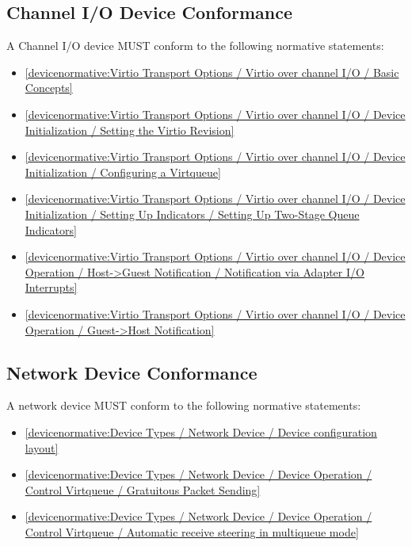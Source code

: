 \subsection{Channel I/O Device Conformance}\label{sec:Conformance / Device Conformance / Channel I/O Device Conformance}

A Channel I/O device MUST conform to the following normative statements:

\begin{itemize}
\item \ref{devicenormative:Virtio Transport Options / Virtio over channel I/O / Basic Concepts}
\item \ref{devicenormative:Virtio Transport Options / Virtio over channel I/O / Device Initialization / Setting the Virtio Revision}
\item \ref{devicenormative:Virtio Transport Options / Virtio over channel I/O / Device Initialization / Configuring a Virtqueue}
\item \ref{devicenormative:Virtio Transport Options / Virtio over channel I/O / Device Initialization / Setting Up Indicators / Setting Up Two-Stage Queue Indicators}
\item \ref{devicenormative:Virtio Transport Options / Virtio over channel I/O / Device Operation / Host->Guest Notification / Notification via Adapter I/O Interrupts}
\item \ref{devicenormative:Virtio Transport Options / Virtio over channel I/O / Device Operation / Guest->Host Notification}
\end{itemize}

\subsection{Network Device Conformance}\label{sec:Conformance / Device Conformance / Network Device Conformance}

A network device MUST conform to the following normative statements:

\begin{itemize}
\item \ref{devicenormative:Device Types / Network Device / Device configuration layout}
\item \ref{devicenormative:Device Types / Network Device / Device Operation / Control Virtqueue / Gratuitous Packet Sending}
\item \ref{devicenormative:Device Types / Network Device / Device Operation / Control Virtqueue / Automatic receive steering in multiqueue mode}
\end{itemize}

